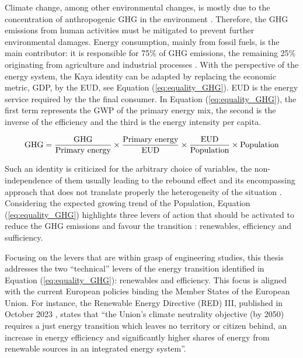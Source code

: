 Climate change, among other environmental changes, is mostly due to the concentration of anthropogenic \acrfull{GHG} in the environment \cite{IPCC_CO2_budget}. Therefore, the \gls{GHG} emissions from human activities must be mitigated to prevent further environmental damages. Energy consumption, mainly from fossil fuels, is the main contributor: it is responsible for 75\% of \gls{GHG} emissions, the remaining 25\% originating from agriculture and industrial processes \cite{ourworldindata_CO2_world}. With the perspective of the energy system, the Kaya identity \cite{kaya1997environment} can be adapted by replacing the economic metric, \gls{GDP}, by the \gls{EUD}, see Equation (\ref{eq:equality_GHG}). \gls{EUD} is the energy service required by the the final consumer. In Equation (\ref{eq:equality_GHG}), the first term represents the \gls{GWP} of the primary energy mix, the second is the inverse of the efficiency and the third is the energy intensity per capita.

\begin{equation}
\label{eq:equality_GHG}
\mathrm{GHG} =  \frac{\mathrm{GHG}}{\text{Primary energy}} \times \frac{\text{Primary energy}}{\mathrm{EUD}}\times \frac{\mathrm{EUD}}{\text{Population}} \times \text{Population}\\
 \end{equation}

Such an identity is criticized for the arbitrary choice of variables, the non-independence of them usually leading to the rebound effect and its encompassing approach that does not translate properly the heterogeneity of the situation \cite{IPCC2000}. Considering the expected growing trend of the Population, Equation (\ref{eq:equality_GHG}) highlights three levers of action that should be activated to reduce the \gls{GHG} emissions and favour the transition \cite{dodson2020population,scovronick2017impact}: renewables, efficiency and sufficiency. 

Focusing on the levers that are within grasp of engineering studies, this thesis addresses the two ``technical'' levers of the energy transition identified in Equation (\ref{eq:equality_GHG}): renewables and efficiency. This focus is aligned with the current European policies binding the Member States of the European Union. For instance, the Renewable Energy Directive (RED) III, published in October 2023 \cite{REDIII}, states that ``the Union’s climate neutrality objective (by 2050) requires a just energy transition which leaves no territory or citizen behind, an increase in energy efficiency and significantly higher shares of energy from renewable sources in an integrated energy system''.%

